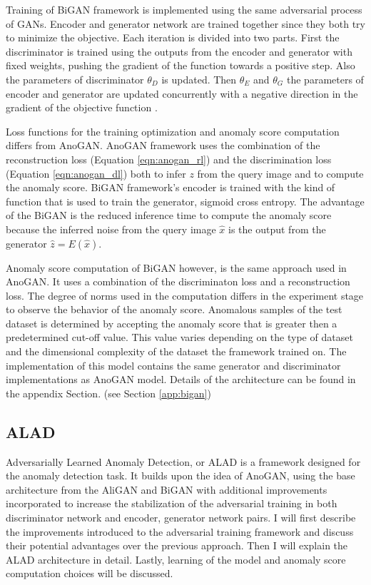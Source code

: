 {Training of BiGAN framework is implemented using the same adversarial process of GANs. Encoder and
generator network are trained together since they both try to minimize the objective. Each iteration
is divided into two parts. First the discriminator is trained using the outputs from the encoder and
generator with fixed weights, pushing the gradient of the function towards a positive step. Also the
parameters of discriminator $\theta_D$ is updated. Then $\theta_E$ and $\theta_G$ the parameters of
encoder and generator are updated concurrently with a negative direction in the gradient of the
objective function \cite{Donahue2017AdversarialFL}.

Loss functions for the training optimization and anomaly score computation differs from AnoGAN\cite{Schlegl2017UnsupervisedAD}. 
AnoGAN framework uses the
combination of the reconstruction loss (Equation \ref{eqn:anogan_rl}) and the discrimination loss
(Equation \ref{eqn:anogan_dl}) both to infer $z$ from the query image and to compute the anomaly
score. BiGAN framework's encoder is trained with the kind of function that is used to train the
generator, sigmoid cross entropy. The advantage of the BiGAN is the reduced inference time to
compute the anomaly score because the inferred noise from the query image $\hat{x}$ is the output
from the generator $\hat{z} = E(\hat{x})$. 

Anomaly score computation of BiGAN however, is the same approach used in AnoGAN. It uses a
combination of the discriminaton loss and a reconstruction loss. The degree of norms used in the
computation differs in the experiment stage to observe the behavior of the anomaly score.
Anomalous samples of the test dataset is determined by accepting the anomaly score that is greater
then a predetermined cut-off value. This value varies depending on the type of dataset and the dimensional
complexity of the dataset the framework trained on.
The implementation of this model contains the same generator and discriminator implementations as AnoGAN model.
Details of the architecture can be found in the appendix Section. (see Section \ref{app:bigan})

\subsection{ALAD}
\label{sec:alad}

Adversarially Learned Anomaly Detection, or ALAD \cite{DBLP:journals/corr/abs-1812-02288} is a
framework designed for the anomaly detection task. It builds upon the idea of AnoGAN, using the base
architecture from the AliGAN and BiGAN with additional improvements incorporated to increase the
stabilization of the adversarial training in both  discriminator network and encoder, generator network pairs.
I will first describe the improvements introduced to the adversarial training framework and discuss
their potential advantages over the previous approach. Then I will explain the ALAD architecture in
detail. Lastly, learning of the model and anomaly score computation choices will be discussed. 

}
